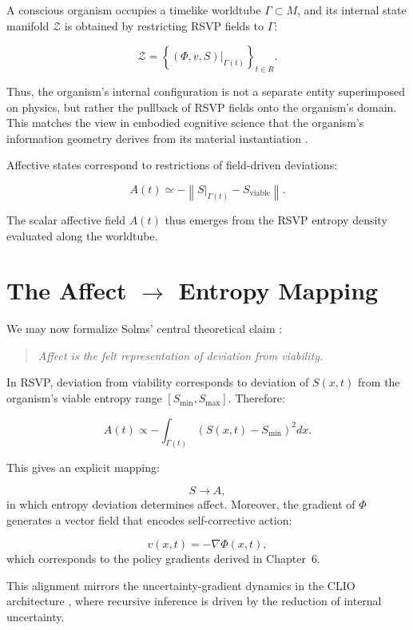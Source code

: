 \documentclass[12pt,oneside]{book}
\theoremstyle{plain}
\theoremstyle{definition}
\let\citep\parencite
\def\mathbb#1{#1}%
\def\mathbf#1{#1}%
\begin{document}
A conscious organism occupies a timelike worldtube $\Gamma \subset M$,
and its internal state manifold $\mathcal{Z}$ is obtained by restricting
RSVP fields to $\Gamma$:

\[
\mathcal{Z} = \left\{ (\Phi,\mathbf{v},S)|_{\Gamma(t)} \right\}_{t\in\mathbb{R}}.
\]

Thus, the organism's internal configuration is not a separate entity
superimposed on physics, but rather the pullback of RSVP fields onto the
organism’s domain.
This matches the view in embodied cognitive science that the organism's
information geometry derives from its material instantiation
\citep{varela1991embodied,clark2015surfing}.

Affective states correspond to restrictions of field-driven deviations:

\[
A(t) \simeq -\left\| S|_{\Gamma(t)} - S_{\mathrm{viable}} \right\|.
\]

The scalar affective field $A(t)$ thus emerges from the RSVP entropy
density evaluated along the worldtube.

\section{The Affect \texorpdfstring{$\rightarrow$}{→} Entropy Mapping}

We may now formalize Solms’ central theoretical claim \citep{solms2021hidden}:

\begin{quote}
\emph{Affect is the felt representation of deviation from viability.}
\end{quote}

In RSVP, deviation from viability corresponds to deviation of
$S(x,t)$ from the organism's viable entropy range $[S_{\min}, S_{\max}]$.
Therefore:

\[
A(t) \propto -\int_{\Gamma(t)} \left( S(x,t) - S_{\min} \right)^2 dx.
\]

This gives an explicit mapping:

\[
S \longrightarrow A,
\]
in which entropy deviation determines affect.
Moreover, the gradient of $\Phi$ generates a vector field that encodes
self-corrective action:

\[
\mathbf{v}(x,t) = -\nabla\Phi(x,t),
\]
which corresponds to the policy gradients derived in Chapter~6.

This alignment mirrors the uncertainty-gradient dynamics in the CLIO
architecture \citep{cheng2025cognitive}, where recursive inference is
driven by the reduction of internal uncertainty.
\end{document}
